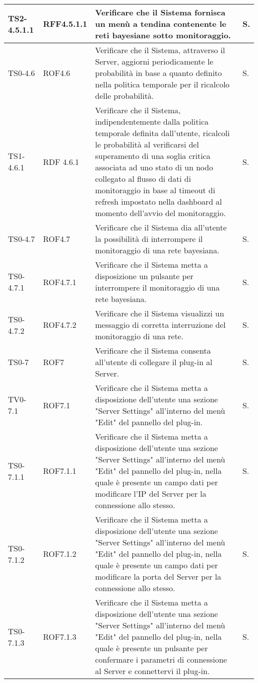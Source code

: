 \begin{longtable}{|C{.15\textwidth}|C{.14\textwidth}|m{.51\textwidth}|C{.08\textwidth}|}
\hline
TS2-4.5.1.1 & RFF4.5.1.1 & Verificare che il Sistema fornisca un menù a  tendina contenente le reti bayesiane sotto monitoraggio. & S. \\
\hline
{}TS0-4.6 & ROF4.6 & Verificare che il Sistema, attraverso il Server, aggiorni periodicamente le probabilità in base a quanto definito nella politica temporale per il ricalcolo delle probabilità. & S. \\
\hline
TS1-4.6.1 & RDF 4.6.1 & Verificare che il Sistema, indipendentemente dalla politica temporale definita dall'utente, ricalcoli le probabilità al verificarsi del superamento di una soglia critica associata ad uno stato di un nodo collegato al flusso di dati di monitoraggio in base al timeout di refresh impostato nella dashboard al momento dell'avvio del monitoraggio. & S. \\
\hline
{}TS0-4.7 & ROF4.7 & Verificare che il Sistema dia all'utente la possibilità di interrompere il monitoraggio di una rete bayesiana. & S. \\
\hline
TS0-4.7.1 & ROF4.7.1 & Verificare che il Sistema metta a disposizione un pulsante per interrompere il monitoraggio di una rete bayesiana. & S. \\
\hline
{}TS0-4.7.2 & ROF4.7.2 & Verificare che il Sistema visualizzi un messaggio di corretta interruzione del monitoraggio di una rete. & S. \\
\hline
TS0-7 & ROF7 & Verificare che il Sistema consenta all'utente di collegare il plug-in al Server. & S. \\
\hline
{}TV0-7.1 & ROF7.1 & Verificare che il Sistema metta a disposizione dell'utente una sezione "Server Settings" all'interno del menù "Edit" del pannello del plug-in. & S. \\
\hline
TS0-7.1.1 & ROF7.1.1 & Verificare che il Sistema metta a disposizione dell'utente una sezione "Server Settings" all'interno del menù "Edit" del pannello del plug-in, nella quale è presente un campo dati per modificare l'IP del Server per la connessione allo stesso. & S. \\
\hline
{}TS0-7.1.2 & ROF7.1.2 & Verificare che il Sistema metta a disposizione dell'utente una sezione "Server Settings" all'interno del menù "Edit" del pannello del plug-in, nella quale è presente un campo dati per modificare la porta del Server per la connessione allo stesso. & S. \\
\hline
TS0-7.1.3 & ROF7.1.3 & Verificare che il Sistema metta a disposizione dell'utente una sezione "Server Settings" all'interno del menù "Edit" del pannello del plug-in, nella quale è presente un pulsante per confermare i parametri di connessione al Server e connettervi il plug-in. & S. \\

\end{longtable}
